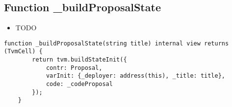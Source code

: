 \subsection{Function \_{}buildProposalState}

\begin{itemize}
\item TODO
\end{itemize}

\begin{lstlisting}[firstnumber=14]
    function _buildProposalState(string title) internal view returns (TvmCell) {
        return tvm.buildStateInit({
            contr: Proposal,
            varInit: {_deployer: address(this), _title: title},
            code: _codeProposal
        });
    }
\end{lstlisting}
